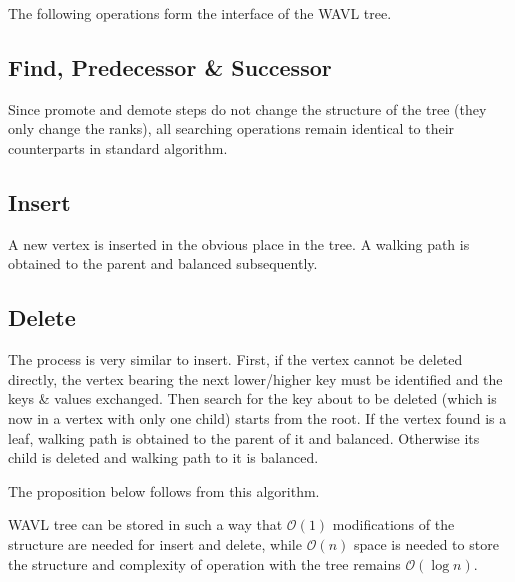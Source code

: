 The following operations form the interface of the WAVL tree.

\subsection{Find, Predecessor \& Successor}

Since promote and demote steps do not change the structure of the tree (they only change the ranks), all searching operations remain identical to their counterparts in standard algorithm.

\subsection{Insert}

A new vertex is inserted in the obvious place in the tree. A walking path is obtained to the parent and balanced subsequently.

\subsection{Delete}

The process is very similar to insert. First, if the vertex cannot be deleted directly, the vertex bearing the next lower/higher key must be identified and the keys \& values exchanged. Then search for the key about to be deleted (which is now in a vertex with only one child) starts from the root. If the vertex found is a leaf, walking path is obtained to the parent of it and balanced. Otherwise its child is deleted and walking path to it is balanced.

The proposition below follows from this algorithm.

\begin{prop}
WAVL tree can be stored in such a way that $\mathcal{O}(1)$ modifications of the structure are needed for insert and delete, while $\mathcal{O}(n)$ space is needed to store the structure and complexity of operation with the tree remains $\mathcal{O}(\log n)$.
\end{prop}

